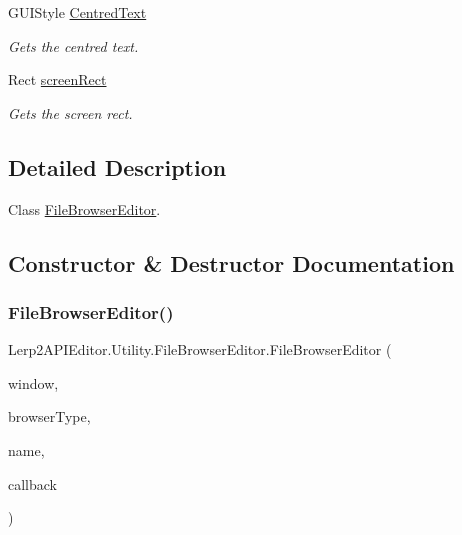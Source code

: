 \begin{DoxyCompactItemize}
G\+U\+I\+Style \hyperlink{class_lerp2_a_p_i_editor_1_1_utility_1_1_file_browser_editor_ac6b9e17ae8d7d078f14dfeda35e6059f}{Centred\+Text}
\begin{DoxyCompactList}\small\item\em Gets the centred text. \end{DoxyCompactList}\item 
Rect \hyperlink{class_lerp2_a_p_i_editor_1_1_utility_1_1_file_browser_editor_a5c611b6c9fa7f3a937ce9ebe2472e2e7}{screen\+Rect}
\begin{DoxyCompactList}\small\item\em Gets the screen rect. \end{DoxyCompactList}\end{DoxyCompactItemize}


\subsection{Detailed Description}
Class \hyperlink{class_lerp2_a_p_i_editor_1_1_utility_1_1_file_browser_editor}{File\+Browser\+Editor}. 



\subsection{Constructor \& Destructor Documentation}
\mbox{\label{class_lerp2_a_p_i_editor_1_1_utility_1_1_file_browser_editor_a8d802048645ebf379b98bed7cf7537df}} 
\subsubsection{\texorpdfstring{File\+Browser\+Editor()}{FileBrowserEditor()}}
{\footnotesize\ttfamily Lerp2\+A\+P\+I\+Editor.\+Utility.\+File\+Browser\+Editor.\+File\+Browser\+Editor (\begin{DoxyParamCaption}\item[{Editor\+Window}]{window,  }\item[{\hyperlink{namespace_lerp2_a_p_i_1_1_utility_af5d628470963cc0f18c37055b4170bf1}{File\+Browser\+Type}}]{browser\+Type,  }\item[{string}]{name,  }\item[{Action$<$ string $>$}]{callback }\end{DoxyParamCaption})\hspace{0.3cm}{\ttfamily [inline]}}



